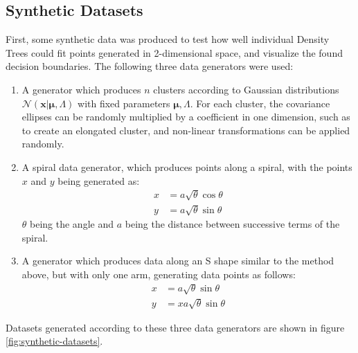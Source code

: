 \documentclass[10pt]{article}
\begin{document}
\subsection{Synthetic Datasets}
\label{subsec:data-synthetic}
First, some synthetic data was produced to test how well individual Density Trees could fit points generated in 2-dimensional space, and visualize the found decision boundaries. The following three data generators were used:
\begin{enumerate}
    \item A generator which produces $n$ clusters according to Gaussian distributions $\mathcal{N}(\mathbf{x}|\boldsymbol{\mu},\mathtt{\Lambda})$ with fixed parameters $\boldsymbol{\mu},\mathtt{\Lambda}$. For each cluster, the covariance ellipses can be randomly multiplied by a coefficient in one dimension, such as to create an elongated cluster, and non-linear transformations can be applied randomly.
    \item A spiral data generator, which produces points along a spiral, with the points $x$ and $y$ being generated as:
    \begin{equation}
        \begin{aligned}
            x &= a\sqrt{\theta}\cos\theta\\
            y &= a\sqrt{\theta}\sin\theta
        \end{aligned}
    \end{equation}
    $\theta$  being the angle and $a$ being the distance between successive terms of the spiral.
    \item A generator which produces data along an S shape similar to the method above, but with only one arm, generating data points as follows:
    \begin{equation}
        \begin{aligned}
            x &= a\sqrt{\theta}\sin\theta\\
            y &= xa\sqrt{\theta}\sin\theta
        \end{aligned}
    \end{equation}
\end{enumerate}

Datasets generated according to these three data generators are shown in figure \ref{fig:synthetic-datasets}.
\end{document}
